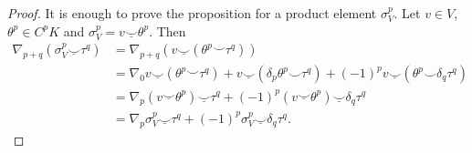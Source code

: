 \documentclass[fleqn]{article}
\theoremstyle{definition}
\newcommand{\usmile}{\underline{\smile}}
\begin{document}
\begin{proof}
  It is enough to prove the proposition for a product element $\sigma_V^p$.
  Let $v \in V$, $\theta^p \in C^p K$ and $\sigma_V^p = v \usmile \theta^p$.
  Then
  \begin{equation}
    \begin{split}
      \nabla_{p + q}(\sigma_V^p \usmile \tau^q)
      & = \nabla_{p + q}(v \usmile (\theta^p \smile \tau^q)) \\
      & = \nabla_0 v \usmile (\theta^p \smile \tau^q)
          + v \usmile (\delta_p \theta^p \smile \tau^q)
          + (-1)^p v \usmile (\theta^p \smile \delta_q \tau^q) \\
      & = \nabla_p(v \usmile \theta^p) \usmile \tau^q
          + (-1)^p (v \usmile \theta^p) \usmile \delta_q \tau^q \\
      & = \nabla_p \sigma_V^p \usmile \tau^q
          + (-1)^p \sigma_V^p \usmile \delta_q \tau^q.
    \end{split}
  \end{equation}
\end{proof}
\end{document}
